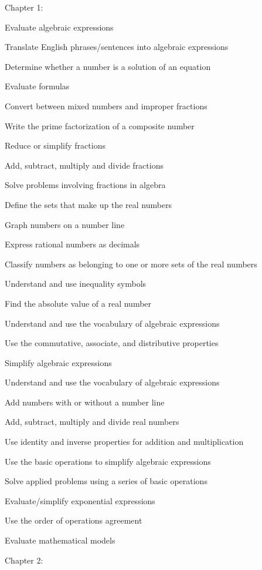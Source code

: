 Chapter 1:
\begin{alphalist}
    \item Evaluate algebraic expressions
    \item Translate English phrases/sentences into algebraic expressions
    \item Determine whether a number is a solution of an equation
    \item Evaluate formulas
    \item Convert between mixed numbers and improper fractions
    \item Write the prime factorization of a composite number
    \item Reduce or simplify fractions
    \item Add, subtract, multiply and divide fractions
    \item Solve problems involving fractions in algebra
    \item Define the sets that make up the real numbers
    \item Graph numbers on a number line
    \item Express rational numbers as decimals
    \item Classify numbers as belonging to one or more sets of the real numbers
    \item Understand and use inequality symbols
    \item Find the absolute value of a real number
    \item Understand and use the vocabulary of algebraic expressions
    \item Use the commutative, associate, and distributive properties
    \item Simplify algebraic expressions
    \item Understand and use the vocabulary of algebraic expressions
    \item Add numbers with or without a number line
    \item Add, subtract, multiply and divide real numbers
    \item Use identity and inverse properties for addition and multiplication 
    \item Use the basic operations to simplify algebraic expressions 
    \item Solve applied problems using a series of basic operations
    \item Evaluate/simplify exponential expressions
    \item Use the order of operations agreement
    \item Evaluate mathematical models
\end{alphalist}
Chapter 2:
 
